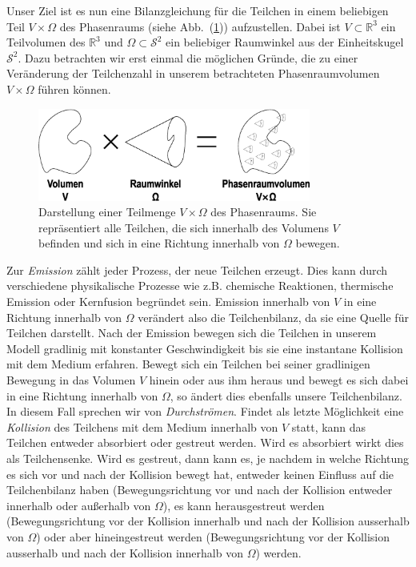 	Unser Ziel ist es nun eine Bilanzgleichung für die Teilchen in einem beliebigen Teil $V \times \Omega$ des Phasenraums (siehe Abb.~(\ref{fig:phasespacevolume})) aufzustellen. Dabei ist $V \subset \mathbb{R}^3$ ein Teilvolumen des $\mathbb{R}^3$ und $\Omega \subset \mathcal{S}^2$ ein beliebiger Raumwinkel aus der Einheitskugel $\mathcal{S}^2$. Dazu betrachten wir erst einmal die möglichen Gründe, die zu einer Veränderung der Teilchenzahl in unserem betrachteten Phasenraumvolumen $V \times \Omega$ führen können.
	\begin{figure}
		\centering
		\includegraphics[width=0.8\textwidth]{phasespacevolume.eps}
		\caption{Darstellung einer Teilmenge $V \times \Omega$ des Phasenraums. Sie repräsentiert alle Teilchen, die sich innerhalb des Volumens $V$ befinden und sich in eine Richtung innerhalb von $\Omega$ bewegen.}
		\label{fig:phasespacevolume}
	\end{figure}

	Zur {\em Emission} zählt jeder Prozess, der neue Teilchen erzeugt. Dies kann durch verschiedene physikalische Prozesse wie z.B. chemische Reaktionen, thermische Emission oder Kernfusion begründet sein. Emission innerhalb von $V$ in eine Richtung innerhalb von $\Omega$ verändert also die Teilchenbilanz, da sie eine Quelle für Teilchen darstellt. Nach der Emission bewegen sich die Teilchen in unserem Modell gradlinig mit konstanter Geschwindigkeit bis sie eine instantane Kollision mit dem Medium erfahren. Bewegt sich ein Teilchen bei seiner gradlinigen Bewegung in das Volumen $V$ hinein oder aus ihm heraus und bewegt es sich dabei in eine Richtung innerhalb von $\Omega$, so ändert dies ebenfalls unsere Teilchenbilanz. In diesem Fall sprechen wir von {\em Durchströmen}. Findet als letzte Möglichkeit eine {\em Kollision} des Teilchens mit dem Medium innerhalb von $V$ statt, kann das Teilchen entweder absorbiert oder gestreut werden. Wird es absorbiert wirkt dies als Teilchensenke. Wird es gestreut, dann kann es, je nachdem in welche Richtung es sich vor und nach der Kollision bewegt hat, entweder keinen Einfluss auf die Teilchenbilanz haben (Bewegungsrichtung vor und nach der Kollision entweder innerhalb oder außerhalb von $\Omega$), es kann herausgestreut werden (Bewegungsrichtung vor der Kollision innerhalb und nach der Kollision ausserhalb von $\Omega$) oder aber hineingestreut werden (Bewegungsrichtung vor der Kollision ausserhalb und nach der Kollision innerhalb von $\Omega$) werden.
	
